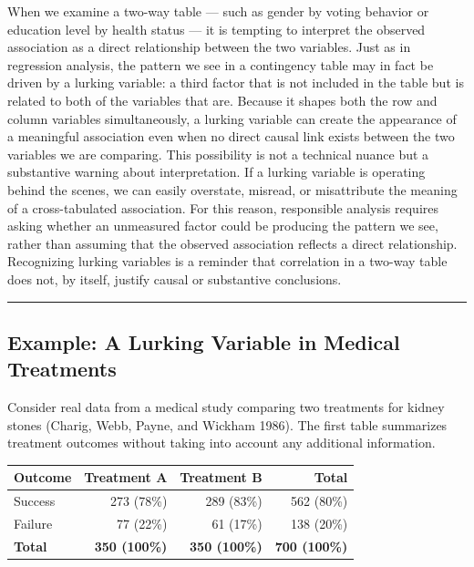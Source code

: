 \documentclass[
  letterpaper,
  DIV=11,
  numbers=noendperiod]{scrreprt}
\begin{document}
When we examine a two-way table --- such as gender by voting behavior or
education level by health status --- it is tempting to interpret the
observed association as a direct relationship between the two variables.
Just as in regression analysis, the pattern we see in a contingency
table may in fact be driven by a lurking variable: a third factor that
is not included in the table but is related to both of the variables
that are. Because it shapes both the row and column variables
simultaneously, a lurking variable can create the appearance of a
meaningful association even when no direct causal link exists between
the two variables we are comparing. This possibility is not a technical
nuance but a substantive warning about interpretation. If a lurking
variable is operating behind the scenes, we can easily overstate,
misread, or misattribute the meaning of a cross-tabulated association.
For this reason, responsible analysis requires asking whether an
unmeasured factor could be producing the pattern we see, rather than
assuming that the observed association reflects a direct relationship.
Recognizing lurking variables is a reminder that correlation in a
two-way table does not, by itself, justify causal or substantive
conclusions.

\begin{center}\rule{0.5\linewidth}{0.5pt}\end{center}

\subsection{Example: A Lurking Variable in Medical
Treatments}\label{example-a-lurking-variable-in-medical-treatments}

Consider real data from a medical study comparing two treatments for
kidney stones (Charig, Webb, Payne, and Wickham 1986). The first table
summarizes treatment outcomes without taking into account any additional
information.

\begin{longtable}[]{@{}lrrr@{}}
\toprule\noalign{}
\textbf{Outcome} & \textbf{Treatment A} & \textbf{Treatment B} &
\textbf{Total} \\
\midrule\noalign{}
\endhead
\bottomrule\noalign{}
\endlastfoot
Success & 273 (78\%) & 289 (83\%) & 562 (80\%) \\
Failure & 77 (22\%) & 61 (17\%) & 138 (20\%) \\
\textbf{Total} & \textbf{350 (100\%)} & \textbf{350 (100\%)} &
\textbf{700 (100\%)} \\
\end{longtable}
\end{document}
